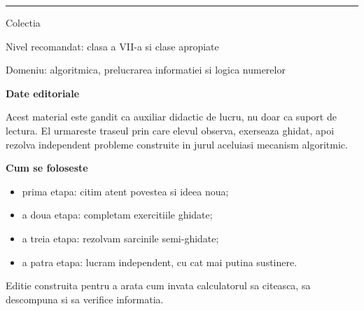 \null
\clearpage

\pagecolor{white}
\color{black}
\thispagestyle{empty}
\null
\clearpage

\pagecolor{white}
\color{black}
\thispagestyle{empty}
\begin{center}
{\Huge\bfseries \IssueTitle}\par
\vspace{0.6em}
{\Large \IssueSubtitle}\par
\vspace{1.2em}
\rule{0.72\linewidth}{0.8pt}\par
\vspace{1.1em}
{\large Colectia \IssueCollection{} \textbullet{} \IssueUniverse}\par
\vspace{0.4em}
{\normalsize Nivel recomandat: clasa a VII-a si clase apropiate}\par
\vspace{0.4em}
{\normalsize Domeniu: algoritmica, prelucrarea informatiei si logica numerelor}
\end{center}

\vspace{1.4em}

\begin{tcolorbox}[colback=white,colframe=black!60,boxrule=0.8pt,arc=1.5mm]
\small
\textbf{Date editoriale}

Acest material este gandit ca auxiliar didactic de lucru, nu doar ca suport de lectura. El urmareste traseul prin care elevul observa, exerseaza ghidat, apoi rezolva independent probleme construite in jurul aceluiasi mecanism algoritmic.
\end{tcolorbox}

\begin{tcolorbox}[colback=white,colframe=black!60,boxrule=0.8pt,arc=1.5mm]
\small
\textbf{Cum se foloseste}
\begin{itemize}
\item prima etapa: citim atent povestea si ideea noua;
\item a doua etapa: completam exercitiile ghidate;
\item a treia etapa: rezolvam sarcinile semi-ghidate;
\item a patra etapa: lucram independent, cu cat mai putina sustinere.
\end{itemize}
\end{tcolorbox}

\vfill
\begin{center}
\small Editie construita pentru a arata cum invata calculatorul sa citeasca, sa descompuna si sa verifice informatia.
\end{center}
\clearpage

